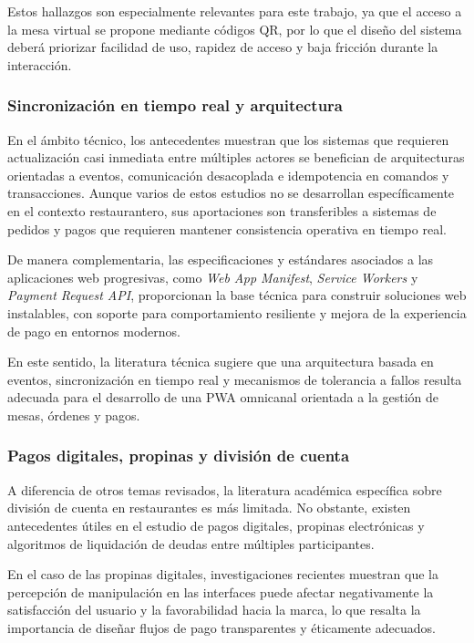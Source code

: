 \documentclass[12pt]{report}
\begin{document}
Estos hallazgos son especialmente relevantes para este trabajo, ya que el acceso a la mesa virtual se propone mediante códigos QR, por lo que el diseño del sistema deberá priorizar facilidad de uso, rapidez de acceso y baja fricción durante la interacción.

\subsubsection{Sincronización en tiempo real y arquitectura}

En el ámbito técnico, los antecedentes muestran que los sistemas que requieren actualización casi inmediata entre múltiples actores se benefician de arquitecturas orientadas a eventos, comunicación desacoplada e idempotencia en comandos y transacciones. Aunque varios de estos estudios no se desarrollan específicamente en el contexto restaurantero, sus aportaciones son transferibles a sistemas de pedidos y pagos que requieren mantener consistencia operativa en tiempo real. \cite{iovescu2024realtime}

De manera complementaria, las especificaciones y estándares asociados a las aplicaciones web progresivas, como \textit{Web App Manifest}, \textit{Service Workers} y \textit{Payment Request API}, proporcionan la base técnica para construir soluciones web instalables, con soporte para comportamiento resiliente y mejora de la experiencia de pago en entornos modernos. \cite{w3c_manifest,w3c_serviceworkers,w3c_paymentrequest}

En este sentido, la literatura técnica sugiere que una arquitectura basada en eventos, sincronización en tiempo real y mecanismos de tolerancia a fallos resulta adecuada para el desarrollo de una PWA omnicanal orientada a la gestión de mesas, órdenes y pagos.

\subsubsection{Pagos digitales, propinas y división de cuenta}

A diferencia de otros temas revisados, la literatura académica específica sobre división de cuenta en restaurantes es más limitada. No obstante, existen antecedentes útiles en el estudio de pagos digitales, propinas electrónicas y algoritmos de liquidación de deudas entre múltiples participantes.

En el caso de las propinas digitales, investigaciones recientes muestran que la percepción de manipulación en las interfaces puede afectar negativamente la satisfacción del usuario y la favorabilidad hacia la marca, lo que resalta la importancia de diseñar flujos de pago transparentes y éticamente adecuados. \cite{alsaati2026etipping}
\end{document}
